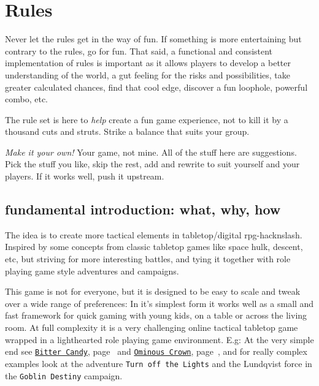 
%
%


\cleardoublepage
\flushbottom


\chapter*{Rules}
Never let the rules get in the way of fun. If something is more entertaining but contrary to the rules, go for fun. That said, a functional and consistent implementation of rules is important as it allows players to develop a better understanding of the world, a gut feeling for the risks and possibilities, take greater calculated chances, find that cool edge, discover a fun loophole, powerful combo, etc.

The rule set is here to \emph{help} create a fun game experience, not to kill it by a thousand cuts and struts. Strike a balance that suits your group.

\emph{Make it your own!} Your game, not mine. All of the stuff here are suggestions. Pick the stuff you like, skip the rest, add and rewrite to suit yourself and your players. If it works well, push it upstream.


\section*{fundamental introduction: what, why, how}
The idea is to create more tactical elements in tabletop/digital rpg-hacknslash. Inspired by some concepts from classic tabletop games like space hulk, descent, etc, but striving for more interesting battles, and tying it together with role playing game style adventures and campaigns.

This game is not for everyone, but it is designed to be easy to scale and tweak over a wide range of preferences: In it's simplest form it works well as a small and fast framework for quick gaming with young kids, on a table or across the living room. At full complexity it is a very challenging online tactical tabletop game wrapped in a lighthearted role playing game environment.
E.g: At the very simple end see
\hyperref[sec:youngkids]{\texttt{Bitter Candy}}, page~\pageref{sec:youngkids} and
\hyperref[sec:basicenough]{\texttt{Ominous Crown}}, page~\pageref{sec:basicenough},
and for really complex examples look at the adventure
\texttt{Turn off the Lights} and
the Lundqvist force in the \texttt{Goblin Destiny}
campaign.

